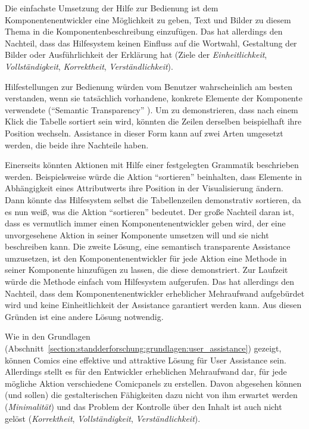 \documentclass[
	headsepline,
	footsepline,
	fontsize=12pt,
	bibliography=totoc
]{scrbook}
\begin{document}

Die einfachste Umsetzung der Hilfe zur Bedienung ist dem Komponentenentwickler eine Möglichkeit zu geben, Text und Bilder zu diesem Thema in die Komponentenbeschreibung einzufügen. Das hat allerdings den Nachteil, dass das Hilfesystem keinen Einfluss auf die Wortwahl, Gestaltung der Bilder oder Ausführlichkeit der Erklärung hat (Ziele der \emph{Einheitlichkeit}, \emph{Vollständigkeit}, \emph{Korrektheit}, \emph{Verständlichkeit}).

Hilfestellungen zur Bedienung würden vom Benutzer wahrscheinlich am besten verstanden, wenn sie tatsächlich vorhandene, konkrete Elemente der Komponente verwendete (\enquote{Semantic Transparency} \cite{Kohlhase2009}). Um zu demonstrieren, dass nach einem Klick die Tabelle sortiert sein wird, könnten die Zeilen derselben beispielhaft ihre Position wechseln. Assistance in dieser Form kann auf zwei Arten umgesetzt werden, die beide ihre Nachteile haben.

Einerseits könnten Aktionen mit Hilfe einer festgelegten Grammatik beschrieben werden. Beispielsweise würde die Aktion \enquote{sortieren} beinhalten, dass Elemente in Abhängigkeit eines Attributwerts ihre Position in der Visualisierung ändern. Dann könnte das Hilfesystem selbst die Tabellenzeilen demonstrativ sortieren, da es nun weiß, was die Aktion \enquote{sortieren} bedeutet. Der große Nachteil daran ist, dass es vermutlich immer einen Komponentenentwickler geben wird, der eine unvorgesehene Aktion in seiner Komponente umsetzen will und sie nicht beschreiben kann. Die zweite Lösung, eine semantisch transparente Assistance umzusetzen, ist den Komponentenentwickler für jede Aktion eine Methode in seiner Komponente hinzufügen zu lassen, die diese demonstriert. Zur Laufzeit würde die Methode einfach vom Hilfesystem aufgerufen. Das hat allerdings den Nachteil, dass dem Komponentenentwickler erheblicher Mehraufwand aufgebürdet wird und keine Einheitlichkeit der Assistance garantiert werden kann. Aus diesen Gründen ist eine andere Lösung notwendig.

Wie in den Grundlagen (Abschnitt~\ref{section:standderforschung:grundlagen:user_assistance}) gezeigt, können Comics eine effektive und attraktive Lösung für User Assistance sein. Allerdings stellt es für den Entwickler erheblichen Mehraufwand dar, für jede mögliche Aktion verschiedene Comicpanels zu erstellen. Davon abgesehen können (und sollen) die gestalterischen Fähigkeiten dazu nicht von ihm erwartet werden (\emph{Minimalität}) und das Problem der Kontrolle über den Inhalt ist auch nicht gelöst (\emph{Korrektheit}, \emph{Vollständigkeit}, \emph{Verständlichkeit}).
\end{document}
